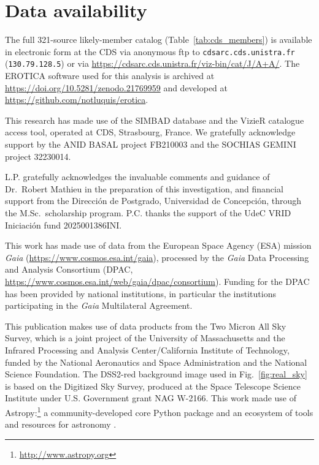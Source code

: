 \documentclass{aa}
\begin{document}
\section*{Data availability}
The full 321-source likely-member catalog (Table~\ref{tab:cds_members}) is available in electronic form at the CDS via anonymous ftp to \texttt{cdsarc.cds.unistra.fr} (\texttt{130.79.128.5}) or via \url{https://cdsarc.cds.unistra.fr/viz-bin/cat/J/A+A/}. The \textsc{EROTICA} software used for this analysis is archived at \url{https://doi.org/10.5281/zenodo.21769959} and developed at \url{https://github.com/notluquis/erotica}.

\begin{acknowledgements}
This research has made use of the SIMBAD database and the VizieR catalogue access tool, operated at CDS, Strasbourg, France. We gratefully acknowledge support by the ANID BASAL project FB210003 and the SOCHIAS GEMINI project 32230014.

L.P. gratefully acknowledges the invaluable comments and guidance of Dr.\ Robert Mathieu in the preparation of this investigation, and financial support from the Dirección de Postgrado, Universidad de Concepción, through the M.Sc.\ scholarship program. P.C. thanks the support of the UdeC VRID Iniciación fund 2025001386INI\@.

This work has made use of data from the European Space Agency (ESA) mission \textit{Gaia} (\url{https://www.cosmos.esa.int/gaia}), processed by the \textit{Gaia} Data Processing and Analysis Consortium (DPAC, \url{https://www.cosmos.esa.int/web/gaia/dpac/consortium}). Funding for the DPAC has been provided by national institutions, in particular the institutions participating in the \textit{Gaia} Multilateral Agreement. 

This publication makes use of data products from the Two Micron All Sky Survey, which is a joint project of the University of Massachusetts and the Infrared Processing and Analysis Center/California Institute of Technology, funded by the National Aeronautics and Space Administration and the National Science Foundation. The DSS2-red background image used in Fig.~\ref{fig:real_sky} is based on the Digitized Sky Survey, produced at the Space Telescope Science Institute under U.S. Government grant NAG W-2166. This work made use of Astropy:\footnote{\url{http://www.astropy.org}} a community-developed core Python package and an ecosystem of tools and resources for astronomy \citep{astropy:2013, astropy:2018, astropy:2022}.
\end{acknowledgements}
\end{document}
